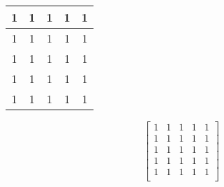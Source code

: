 \documentclass[a4]{article}
\begin{document}
\begin{tabular} {|c |c |c |c |c |}  
 \hline 
1 & 1 & 1 & 1 & 1 \\ \hline 
1 & 1 & 1 & 1 & 1 \\ \hline 
1 & 1 & 1 & 1 & 1 \\ \hline 
1 & 1 & 1 & 1 & 1 \\ \hline 
1 & 1 & 1 & 1 & 1 \\ \hline 
\end{tabular}  

\[
\begin{bmatrix} 
1 & 1 & 1 & 1 & 1 \\  
1 & 1 & 1 & 1 & 1 \\  
1 & 1 & 1 & 1 & 1 \\  
1 & 1 & 1 & 1 & 1 \\  
1 & 1 & 1 & 1 & 1 \\
\end{bmatrix}  
\]
\end{document}
